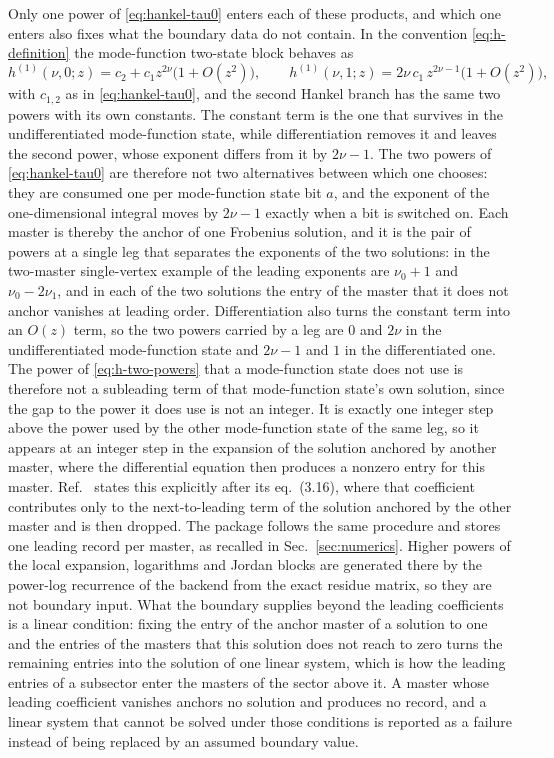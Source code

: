 \documentclass[11pt,a4paper]{article}
\begin{document}
Only one power of \eqref{eq:hankel-tau0} enters each of these products, and which one enters also
fixes what the boundary data do not contain. In the convention
\eqref{eq:h-definition} the mode-function two-state block behaves as
\begin{equation}
  h^{(1)}(\nu,0;z)=c_2+c_1z^{2\nu}\bigl(1+O(z^2)\bigr),
  \qquad
  h^{(1)}(\nu,1;z)=2\nu\,c_1\,z^{2\nu-1}\bigl(1+O(z^2)\bigr),
  \label{eq:h-two-powers}
\end{equation}
with $c_{1,2}$ as in \eqref{eq:hankel-tau0}, and the second Hankel branch has the same two powers with
its own constants. The constant term is the one that survives in the undifferentiated mode-function state, while
differentiation removes it and leaves the second power, whose exponent differs from it by $2\nu-1$. The
two powers of \eqref{eq:hankel-tau0} are therefore not two alternatives between which one chooses: they
are consumed one per mode-function state bit $a$, and the exponent of the one-dimensional integral moves by $2\nu-1$
exactly when a bit is switched on. Each master is thereby the anchor of one Frobenius solution, and it
is the pair of powers at a single leg that separates the exponents of the two solutions: in the
two-master single-vertex example of \cite{Chen:2024glu} the leading exponents are $\nu_0+1$ and
$\nu_0-2\nu_1$, and in each of the two solutions the entry of the master that it does not anchor
vanishes at leading
order. Differentiation also turns the constant term into an $O(z)$ term, so the two powers carried by a leg
are $0$ and $2\nu$ in the undifferentiated mode-function state and $2\nu-1$ and $1$ in the differentiated one. The
power of \eqref{eq:h-two-powers} that a mode-function state does not use is therefore not a subleading term of that
mode-function state's own solution, since the gap to the power it does use is not an integer. It is exactly one
integer step above the power used by the other mode-function state of the same leg, so it appears at an
integer step in the expansion of the solution anchored by another master, where the differential equation
then produces a nonzero entry for this master. Ref.~\cite{Chen:2024glu} states
this explicitly after its eq.~(3.16), where
that coefficient contributes only to the next-to-leading term of the solution anchored by the other
master and is then dropped. The package follows the same procedure and stores one leading record per
master, as recalled in Sec.~\ref{sec:numerics}. Higher powers of the local expansion,
logarithms and Jordan blocks are generated there by the power-log recurrence of the backend from the
exact residue matrix, so they are not boundary input. What the boundary supplies beyond the leading
coefficients is a linear condition: fixing the entry of the anchor master of a solution to one and
the entries of the masters that this solution does not reach to zero turns the remaining entries
into the solution of one linear system, which is how the leading entries of a subsector enter the masters
of the sector above it. A master whose leading coefficient vanishes anchors no solution and produces no
record, and a linear system that cannot be solved under those conditions is reported as a failure
instead of being replaced by an assumed boundary value.
\end{document}
